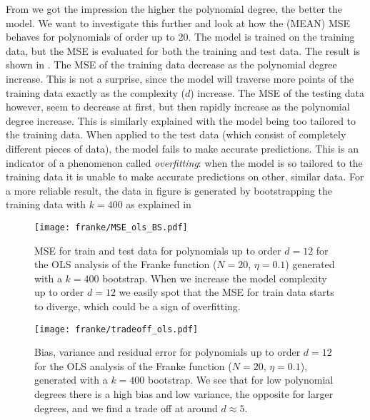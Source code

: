             From  we got the impression the higher the polynomial degree, the better the model. We want to investigate this further and look at how the (MEAN) MSE behaves for polynomials of order up to 20. The model is trained on the training data, but the MSE is evaluated for both the training and test data. The result is shown in . The MSE of the training data decrease as the polynomial degree increase. This is not a surprise, since the model will traverse more points of the training data exactly as the complexity ($d$) increase. The MSE of the testing data however, seem to decrease at first, but then rapidly increase as the polynomial degree increase. This is similarly explained with the model being too tailored to the training data. When applied to the test data (which consist of completely different pieces of data), the model fails to make accurate predictions. This is an indicator of a phenomenon called \textit{overfitting}: when the model is so tailored to the training data it is unable to make accurate predictions on other, similar data. For a more reliable result, the data in figure  is generated by bootstrapping the training data with $k=400$ as explained in 

            \begin{figure}
                \texttt{[image: franke/MSE\_ols\_BS.pdf]}
                \caption{MSE for train and test data for polynomials up to order $d=12$ for the OLS analysis of the Franke function ($N=20$, $\eta=0.1$) generated with a $k=400$ bootstrap. When we increase the model complexity  up to order $d=12$ we easily  spot that the MSE for train data starts to diverge, which could be a sign of overfitting. }
                \label{fig:model_complexity_ols}
            \end{figure}

            
            \begin{figure}
                \texttt{[image: franke/tradeoff\_ols.pdf]}
                \caption{Bias, variance and residual error for polynomials up to order $d=12$ for the OLS analysis of the Franke function ($N=20$, $\eta=0.1$), generated with a $k=400$ bootstrap. We see that for low polynomial degrees there is a high bias and low variance, the opposite for larger degrees, and we find a trade off at around $d\approx 5$.}
                \label{fig:bias_variance_ols}
            \end{figure}
            
